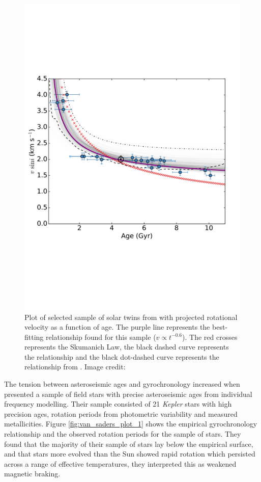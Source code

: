 \begin{figure}[h]
    \centering
    \includegraphics[scale=0.35]{Figures/2-Historical_overview/dos_santos_2016.pdf}
    \caption[Rotational evolution of sample of solar twins from \citet{dos_Santos_etal_2016} ]{Plot of selected sample of solar twins from \citet{dos_Santos_etal_2016} with projected rotational velocity as a function of age. The purple line represents the best-fitting relationship found for this sample ($v \propto t^{-0.6}$). The red crosses represents the Skumanich Law, the black dashed curve represents the \citet{do_Nascimento_etal_2014} relationship and the black dot-dashed curve represents the relationship from \citet{Pace_Pasquini_2004}. Image credit: \citet{dos_Santos_etal_2016}}
    \label{fig:dos_santos_2016}
\end{figure}

The tension between asteroseismic ages and gyrochronology increased when \citet{van_Saders_etal_2016} presented a sample of field stars with precise asteroseismic ages from individual frequency modelling. Their sample consisted of 21 \textit{Kepler} stars with high precision ages, rotation periods from photometric variability and measured metallicities. Figure \ref{fig:van_saders_plot_1} shows the empirical gyrochronology relationship and the observed rotation periods for the \citet{van_Saders_etal_2016} sample of stars. They found that the majority of their sample of stars lay below the empirical surface, and that stars more evolved than the Sun showed rapid rotation which persisted across a range of effective temperatures, they interpreted this as weakened magnetic braking.

